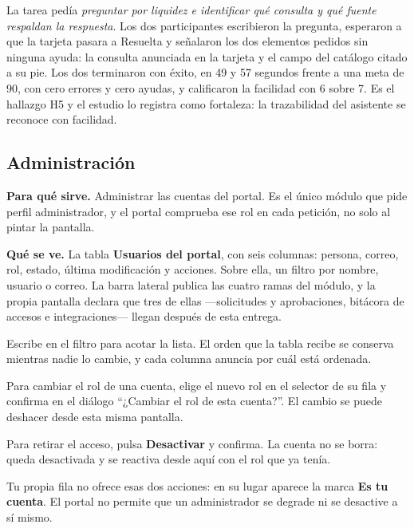 \begin{uxnota}
La tarea pedía \emph{preguntar por liquidez e identificar qué consulta y qué fuente respaldan la
respuesta}. Los dos participantes escribieron la pregunta, esperaron a que la tarjeta pasara a
Resuelta y señalaron los dos elementos pedidos sin ninguna ayuda: la consulta anunciada en la
tarjeta y el campo del catálogo citado a su pie. Los dos terminaron con éxito, en 49 y 57 segundos
frente a una meta de 90, con cero errores y cero ayudas, y calificaron la facilidad con 6 sobre 7.
Es el hallazgo H5 y el estudio lo registra como fortaleza: la trazabilidad del asistente se
reconoce con facilidad.
\end{uxnota}

\clearpage
\subsection{Administración}

\textbf{Para qué sirve.} Administrar las cuentas del portal. Es el único módulo que pide perfil
administrador, y el portal comprueba ese rol en cada petición, no solo al pintar la pantalla.

\textbf{Qué se ve.} La tabla \textbf{Usuarios del portal}, con seis columnas: persona, correo,
rol, estado, última modificación y acciones. Sobre ella, un filtro por nombre, usuario o correo.
La barra lateral publica las cuatro ramas del módulo, y la propia pantalla declara que tres de
ellas ---solicitudes y aprobaciones, bitácora de accesos e integraciones--- llegan después de esta
entrega.


\begin{uxpreg}
  \item Escribe en el filtro para acotar la lista. El orden que la tabla recibe se conserva
    mientras nadie lo cambie, y cada columna anuncia por cuál está ordenada.
  \item Para cambiar el rol de una cuenta, elige el nuevo rol en el selector de su fila y confirma
    en el diálogo \enquote{¿Cambiar el rol de esta cuenta?}. El cambio se puede deshacer desde
    esta misma pantalla.
  \item Para retirar el acceso, pulsa \textbf{Desactivar} y confirma. La cuenta no se borra: queda
    desactivada y se reactiva desde aquí con el rol que ya tenía.
  \item Tu propia fila no ofrece esas dos acciones: en su lugar aparece la marca \textbf{Es tu
    cuenta}. El portal no permite que un administrador se degrade ni se desactive a sí mismo.
\end{uxpreg}

